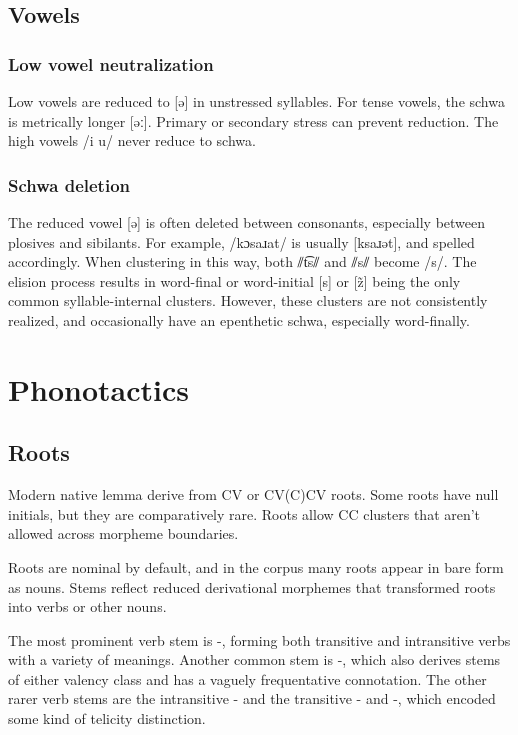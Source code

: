 \section{Vowels}
\subsection{Low vowel neutralization} \label{sub:schwa_neutral}
Low vowels are reduced to [ə] in unstressed syllables. For tense vowels, the schwa is metrically longer [əː]. Primary or secondary stress can prevent reduction. The high vowels /i u/ never reduce to schwa.

\subsection{Schwa deletion} \label{sub:schwa_delete}
The reduced vowel [ə] is often deleted between consonants, especially between plosives and sibilants. For example,  /kɔsaɹat/ is usually [ksaɹət], and spelled accordingly. When clustering in this way, both ⫽t͡s⫽ and ⫽s⫽ become /s/. The elision process results in word-final or word-initial [s] or [z̃] being the only common syllable-internal clusters. However, these clusters are not consistently realized, and occasionally have an epenthetic schwa, especially word-finally. 

\setchapterpreamble[u]{\margintoc}
\chapter{Phonotactics}
\section{Roots}
Modern native lemma derive from CV or CV(C)CV roots. Some roots have null initials, but they are comparatively rare. Roots allow CC clusters that aren't allowed across morpheme boundaries.

Roots are nominal by default, and in the corpus many roots appear in bare form as nouns. Stems reflect reduced derivational morphemes that transformed roots into verbs or other nouns.

The most prominent verb stem is -, forming both transitive and intransitive verbs with a variety of meanings. Another common stem is -, which also derives stems of either valency class and has a vaguely frequentative connotation. The other rarer verb stems are the intransitive - and the transitive - and -, which encoded some kind of telicity distinction.

